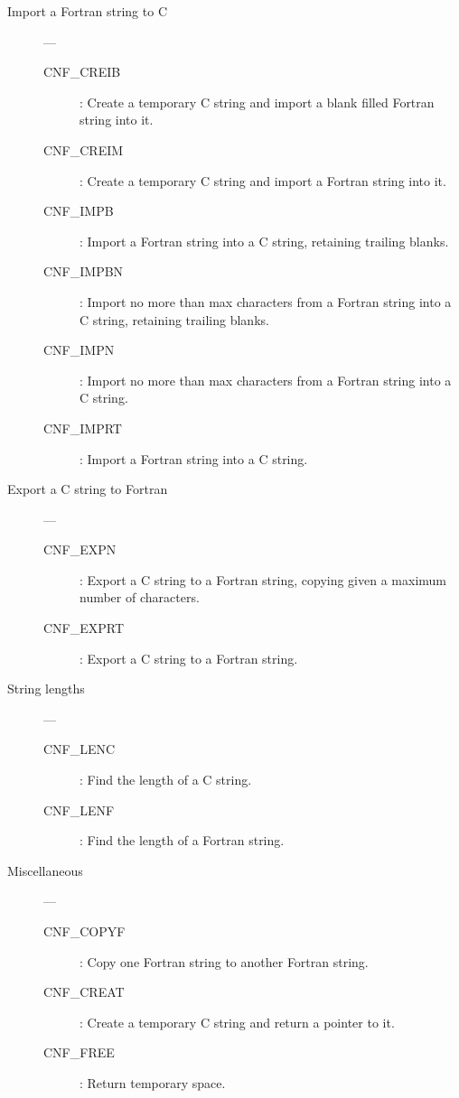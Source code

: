 \begin{description}

\item [Import a Fortran string to C] ---

\begin{description}
\item [CNF\_CREIB] : Create a temporary C string and import a blank filled Fortran string into it.
\item [CNF\_CREIM] : Create a temporary C string and import a Fortran string into it.
\item [CNF\_IMPB] : Import a Fortran string into a C string, retaining trailing blanks.
\item [CNF\_IMPBN] : Import no more than max characters from a Fortran string into a C string, retaining trailing blanks.
\item [CNF\_IMPN] : Import no more than max characters from a Fortran string into a C string.
\item [CNF\_IMPRT] : Import a Fortran string into a C string.
\end{description}

\item [Export a C string to Fortran] ---

\begin{description}
\item [CNF\_EXPN] : Export a C string to a Fortran string, copying given a maximum number of characters.
\item [CNF\_EXPRT] : Export a C string to a Fortran string.
\end{description}

\item [String lengths] ---

\begin{description}
\item [CNF\_LENC] : Find the length of a C string.
\item [CNF\_LENF] : Find the length of a Fortran string.
\end{description}

\item [Miscellaneous] ---

\begin{description}
\item [CNF\_COPYF] : Copy one Fortran string to another Fortran string.
\item [CNF\_CREAT] : Create a temporary C string and return a pointer to it.
\item [CNF\_FREE] : Return temporary space.
\end{description}

\end{description}

